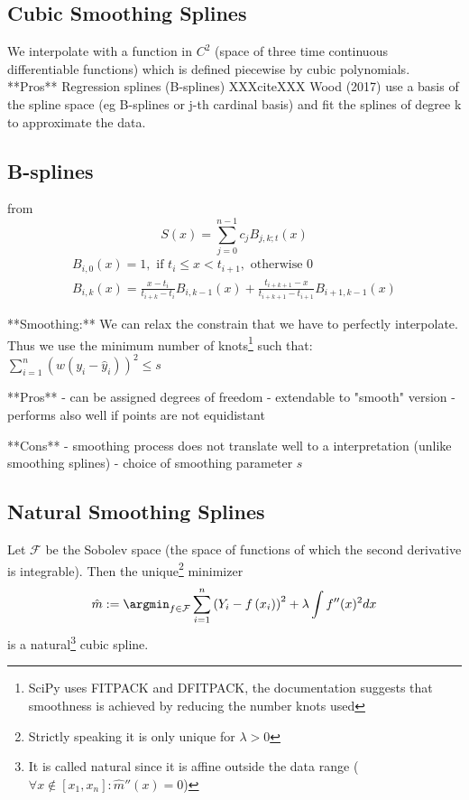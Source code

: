 \subsection{Cubic Smoothing Splines}
\label{sec:Cubic}
We interpolate with a function in $C^2$ (space of three time continuous differentiable functions) which is defined piecewise by cubic polynomials.
**Pros**
Regression splines (B-splines)
XXXciteXXX Wood (2017)
use a basis of the spline space (eg B-splines or j-th cardinal basis) and fit the splines of degree k to approximate the data.

\subsection{B-splines}
\label{sec:B}
from \cite{t.lycheSplineMethods}
$$
    S(x)=\sum_{j=0}^{n-1} c_{j} B_{j, k ; t}(x)
$$
$$
    \begin{array}{r}
        B_{i, 0}(x)=1, \text { if } t_{i} \leq x<t_{i+1}, \text { otherwise } 0 \\
        B_{i, k}(x)=\frac{x-t_{i}}{t_{i+k}-t_{i}} B_{i, k-1}(x)+\frac{t_{i+k+1}-x}{t_{i+k+1}-t_{i+1}} B_{i+1, k-1}(x)
    \end{array}
$$

**Smoothing:**
We can relax the constrain that we have to perfectly interpolate. Thus we use the minimum number of knots\footnote{SciPy uses FITPACK and DFITPACK, the documentation suggests that smoothness is achieved by reducing the number knots used} such that:
$\sum_{i=1}^n(w (y_i - \hat y_i))^2 \leq s$

**Pros**
- can be assigned degrees of freedom
- extendable to "smooth" version
- performs also well if points are not equidistant

**Cons**
- smoothing process does not translate well to a interpretation (unlike smoothing splines)
- choice of smoothing parameter $s$

\subsection{Natural Smoothing Splines}
\label{sec:Natural}
Let $\mathcal F$ be the Sobolev space (the space of functions of which the second derivative is integrable). Then the unique\footnote{Strictly speaking it is only unique for $\lambda > 0$} minimizer
$$\hat m :=\argmin_{f \in \mathcal F} \sum_{i=1}^{n}\left(Y_{i}-{f}\left(x_{i}\right)\right)^{2}+\lambda \int {f}^{\prime \prime}(x)^{2} d x$$
is a natural\footnote{It is called natural since it is affine outside the data range ($\forall x\notin [x_1, x_n]:\hat m''(x) = 0$)} cubic spline.

